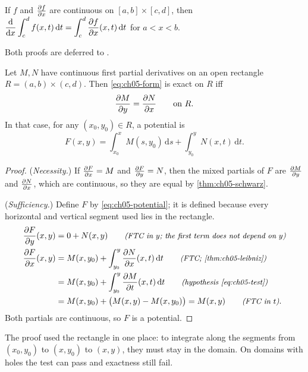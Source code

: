 \begin{theorem}\label{thm:ch05-leibniz}
If $f$ and $\frac{\partial f}{\partial x}$ are continuous on $[a,b]\times[c,d]$, then
$\displaystyle\frac{\mathrm{d}}{\mathrm{d}x}\int_c^d f(x,t)\,\mathrm{d}t = \int_c^d\frac{\partial f}{\partial x}(x,t)\,\mathrm{d}t$
for $a<x<b$.
\end{theorem}
\noindent Both proofs are deferred to \textcite[Ch.~9]{Rudin}.

\begin{theorem}\label{thm:ch05-test}
Let $M, N$ have continuous first partial derivatives on an open rectangle
$R = (a,b)\times(c,d)$. Then \eqref{eq:ch05-form} is exact on $R$ iff
\begin{equation}\label{eq:ch05-test}
  \frac{\partial M}{\partial y} = \frac{\partial N}{\partial x}\qquad\text{on } R .
\end{equation}
In that case, for any $(x_0,y_0)\in R$, a potential is
\begin{equation}\label{eq:ch05-potential}
  F(x,y) = \int_{x_0}^{x}M(s,y_0)\,\mathrm{d}s + \int_{y_0}^{y}N(x,t)\,\mathrm{d}t .
\end{equation}
\end{theorem}

\begin{proof}
(\emph{Necessity.}) If $\frac{\partial F}{\partial x} = M$ and $\frac{\partial F}{\partial y} = N$, then the mixed
partials of $F$ are $\frac{\partial M}{\partial y}$ and $\frac{\partial N}{\partial x}$, which are continuous, so
they are equal by \cref{thm:ch05-schwarz}.

(\emph{Sufficiency.}) Define $F$ by \eqref{eq:ch05-potential}; it is defined
because every horizontal and vertical segment used lies in the rectangle.
\begin{align*}
  \pder{F}{y}(x,y) &= 0 + N(x,y)
     \why{FTC in $y$; the first term does not depend on $y$}\\
  \pder{F}{x}(x,y) &= M(x,y_0) + \int_{y_0}^{y}\pder{N}{x}(x,t)\,\mathrm{d}t
     \why{FTC; \cref{thm:ch05-leibniz}}\\
  &= M(x,y_0) + \int_{y_0}^{y}\pder{M}{t}(x,t)\,\mathrm{d}t
     \why{hypothesis \eqref{eq:ch05-test}}\\
  &= M(x,y_0) + \bigl(M(x,y) - M(x,y_0)\bigr) = M(x,y)
     \why{FTC in $t$}.
\end{align*}
Both partials are continuous, so $F$ is a potential.
\end{proof}

The proof used the rectangle in one place: to integrate along the segments from
$(x_0,y_0)$ to $(x,y_0)$ to $(x,y)$, they must stay in the domain. On domains
with holes the test can pass and exactness still fail.

